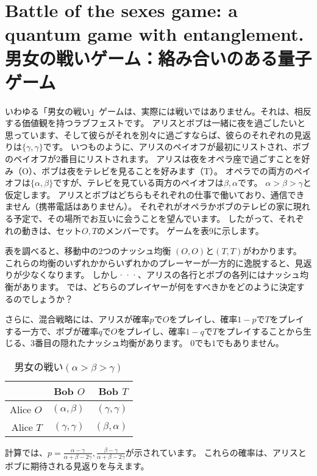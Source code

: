 \section{Battle of the sexes game: a quantum game with entanglement.男女の戦いゲーム：絡み合いのある量子ゲーム}

いわゆる「男女の戦い」ゲームは、実際には戦いではありません。それは、相反する価値観を持つラブフェストです。
アリスとボブは一緒に夜を過ごしたいと思っています、そして彼らがそれを別々に過ごすならば、彼らのそれぞれの見返りは$\{ \gamma,\gamma \}$です。
いつものように、アリスのペイオフが最初にリストされ、ボブのペイオフが2番目にリストされます。
アリスは夜をオペラ座で過ごすことを好み（O）、ボブは夜をテレビを見ることを好みます（T）。
オペラでの両方のペイオフは$\{ \alpha, \beta \}$ですが、テレビを見ている両方のペイオフは${\beta, \alpha}$です。
$\alpha > \beta > \gamma$と仮定します。
アリスとボブはどちらもそれぞれの仕事で働いており、通信できません（携帯電話はありません）。
それぞれがオペラかボブのテレビの家に現れる予定で、その場所でお互いに会うことを望んでいます。
したがって、それぞれの動きは、セット${O,T}$のメンバーです。 ゲームを表9に示します。

表を調べると、移動中の2つのナッシュ均衡 $(O,O)$と$(T,T)$がわかります。 これらの均衡のいずれかからいずれかのプレーヤーが一方的に逸脱すると、見返りが少なくなります。 しかし···、アリスの各行とボブの各列にはナッシュ均衡があります。 では、どちらのプレイヤーが何をすべきかをどのように決定するのでしょうか？

さらに、混合戦略には、アリスが確率$p$で$O$をプレイし、確率$1 - p$で$T$をプレイする一方で、ボブが確率$q$で$O$をプレイし、確率$1 − q$で$T$をプレイすることから生じる、3番目の隠れたナッシュ均衡があります。 $0$でも$1$でもありません。\\

\begin{table}[htb]
\caption{男女の戦い$(\alpha > \beta > \gamma)$}
\centering
\begin{tabular}{|r|r|r|} \hline
 & Bob $O$ & Bob $T$ \\ \hline
Alice $O$ & $(\alpha,\beta)$ & $(\gamma,\gamma)$   \\
Alice $T$ & $(\gamma,\gamma)$ & $(\beta, \alpha)$ \\ \hline
\end{tabular}
\end{table} 



計算では、$p = \frac{\alpha - \gamma}{\alpha + \beta -2 \gamma}, \frac{\beta - \gamma}{\alpha + \beta -2 \gamma}  $が示されています。 これらの確率は、アリスとボブに期待される見返りを与えます。

